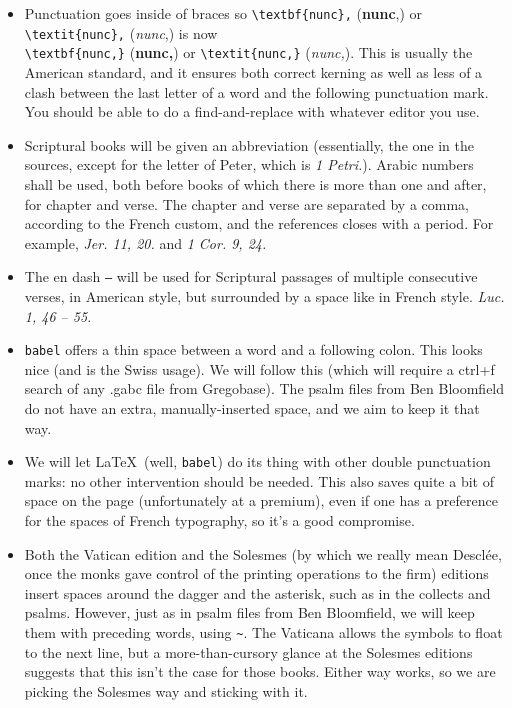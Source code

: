\documentclass[11pt]{article}
\begin{document}
\begin{itemize}
\item
 Punctuation goes inside of braces so \verb|\textbf{nunc},| (\textbf{nunc},) or \verb|\textit{nunc},| (\textit{nunc},) is now\\ \verb|\textbf{nunc,}| (\textbf{nunc,}) or \verb|\textit{nunc,}| (\textit{nunc,}). This is usually the American standard, and it ensures both correct kerning as well as less of a clash between the last letter of a word and the following punctuation mark. You should be able to do a find-and-replace with whatever editor you use.
 \item
Scriptural books will be given an abbreviation (essentially, the one in the sources, except for the letter of Peter, which is \textit{1 Petri.}). Arabic numbers shall be used, both before books of which there is more than one and after, for chapter and verse. The chapter and verse are separated by a comma, according to the French custom, and the references closes with a period.
 For example, \hspace{0.05em}\textit{Jer. 11, 20.} and \textit{1 Cor. 9, 24.}
 \item
The en dash \verb|–| will be used for Scriptural passages of multiple consecutive verses, in American style, but surrounded by a space like in French style. \textit{Luc. 1, 46 – 55.}
\item
\verb|babel| offers a thin space between a word and a following colon. This looks nice (and is the Swiss usage). We will follow this (which will require a ctrl+f search of any .gabc file from Gregobase). The psalm files from Ben Bloomfield do not have an extra, manually-inserted space, and we aim to keep it that way.
\item
We will let \LaTeX\ (well, \verb|babel|) do its thing with other double punctuation marks: no other intervention should be needed. This also saves quite a bit of space on the page (unfortunately at a premium), even if one has a preference for the spaces of French typography, so it's a good compromise.
\item
Both the Vatican edition and the Solesmes (by which we really mean Desclée, once the monks gave control of the printing operations to the firm) editions insert spaces around the dagger and the asterisk, such as in the collects and psalms. However, just as in psalm files from Ben Bloomfield, we will keep them with preceding words, using \verb|~|. The Vaticana allows the symbols to float to the next line, but  a more-than-cursory glance at the Solesmes editions suggests that this isn't the case for those books. Either way works, so we are picking the Solesmes way and sticking with it.

\end{itemize}
\end{document}
